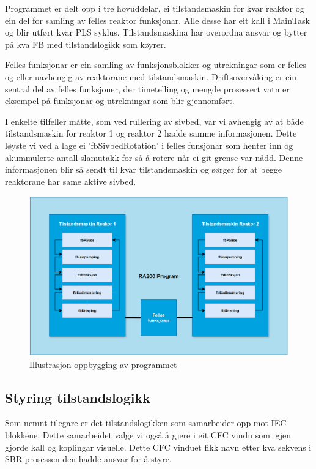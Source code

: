 Programmet er delt opp i tre hovuddelar, ei tilstandsmaskin for kvar reaktor og ein del for samling av felles reaktor funksjonar.
Alle desse har eit kall i MainTask og blir utført kvar PLS syklus. Tilstandsmaskina har overordna ansvar og bytter på kva 
\gls{FB} med tilstandslogikk som køyrer.

Felles funksjonar er ein samling av funksjonsblokker og utrekningar som er felles og eller uavhengig av reaktorane med tilstandsmaskin.
Driftsovervåking er ein sentral del av felles funksjoner, der timetelling og mengde prosessert vatn er eksempel på funksjonar og utrekningar
som blir gjennomført.

I enkelte tilfeller måtte, som ved rullering av sivbed, var vi avhengig av at både tilstandsmaskin for reaktor 1 og reaktor 2 hadde samme informasjonen.
Dette løyste vi ved å lage ei 'fbSivbedRotation' i felles funsjonar som henter inn og akummulerte antall slamutakk for så å rotere når ei git grense var nådd.
Denne informasjonen blir så sendt til kvar tilstandsmaskin og sørger for at begge reaktorane har same aktive sivbed.


\begin{figure}[htbp]
    \centering
    \includegraphics[width=1\textwidth]{Figurar/Oppbygging_Program.png}
    \caption{Illustrasjon oppbygging av programmet}\label{fig:OppbyggingProgram}
\end{figure}


\newpage

\subsection{Styring tilstandslogikk}

Som nemnt tilegare er det tilstandslogikken som samarbeider opp mot IEC blokkene. Dette samarbeidet valge vi også å gjere i eit
CFC vindu som igjen gjorde kall og koplingar visuelle. Dette CFC vinduet fikk navn etter kva sekvens i SBR-prosessen
den hadde ansvar for å styre. 

